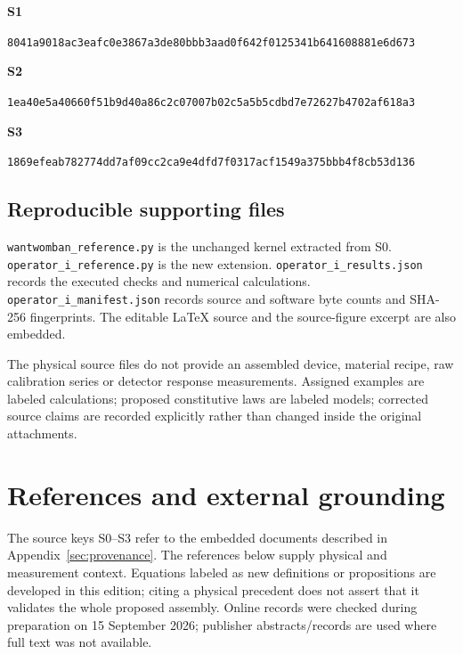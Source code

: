 \documentclass[10pt,a4paper]{article}
\numberwithin{equation}{section}
\newcommand{\newpart}{\clearpage}
\begin{document}
\textbf{S1}\par\texttt{8041a9018ac3eafc0e3867a3de80bbb3aad0f642f0125341b641608881e6d673}

\textbf{S2}\par\texttt{1ea40e5a40660f51b9d40a86c2c07007b02c5a5b5cdbd7e72627b4702af618a3}

\textbf{S3}\par\texttt{1869efeab782774dd7af09cc2ca9e4dfd7f0317acf1549a375bbb4f8cb53d136}
\normalsize

\subsection*{Reproducible supporting files}
\texttt{wantwomban\_reference.py} is the unchanged kernel extracted from S0. \texttt{operator\_i\_reference.py} is the new extension. \texttt{operator\_i\_results.json} records the executed checks and numerical calculations. \texttt{operator\_i\_manifest.json} records source and software byte counts and SHA-256 fingerprints. The editable LaTeX source and the source-figure excerpt are also embedded.

The physical source files do not provide an assembled device, material recipe, raw calibration series or detector response measurements. Assigned examples are labeled calculations; proposed constitutive laws are labeled models; corrected source claims are recorded explicitly rather than changed inside the original attachments.

\newpart
\section{References and external grounding}
\label{sec:refs}
The source keys S0--S3 refer to the embedded documents described in Appendix~\ref{sec:provenance}. The references below supply physical and measurement context. Equations labeled as new definitions or propositions are developed in this edition; citing a physical precedent does not assert that it validates the whole proposed assembly. Online records were checked during preparation on 15 September 2026; publisher abstracts/records are used where full text was not available.
\end{document}
